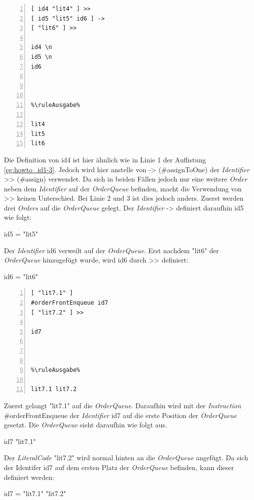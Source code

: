{
\begin{multicols}{2}
\begin{lstlisting}[language=QHS, caption=Beispiel zu {\selectListingFont \#assignToOne}, numbers=left, stepnumber=1]
%\ruleEingabe%
[ id4 "lit4" ] >>
[ id5 "lit5" id6 ] ->
[ "lit6" ] >>

id4 \n
id5 \n
id6



%\ruleAusgabe%

lit4
lit5
lit6
\end{lstlisting}
\columnbreak
Die Definition von {\selectListingFont id4} ist hier ähnlich wie in Linie 1 der Auflistung \ref{eg:howto_id1-3}.
Jedoch wird hier anstelle von {\selectListingFont ->} ({\selectListingFont \#assignToOne}) der \textit{Identifier} {\selectListingFont >>} ({\selectListingFont \#assign}) verwendet.
Da sich in beiden Fällen jedoch nur eine weitere \textit{Order} neben dem \textit{Identifier} auf der \textit{OrderQueue} befinden, macht die Verwendung von {\selectListingFont >>} keinen Unterschied.
Bei Linie 2 und 3 ist dies jedoch anders. Zuerst werden drei \textit{Orders} auf die \textit{OrderQueue} gelegt. Der \textit{Identifier} {\selectListingFont ->} definiert daraufhin {\selectListingFont id5} wie folgt: \break
\centerline{\selectListingFont id5 = "lit5"{}}
Der \textit{Identifier} {\selectListingFont id6} verweilt auf der \textit{OrderQueue}.
Erst nachdem {\selectListingFont "lit6"{}} der \textit{OrderQueue} hinzugefügt wurde, wird {\selectListingFont id6} durch {\selectListingFont >>} definiert: \break
\centerline{\selectListingFont id6 = "lit6"{}}
\end{multicols}
}

{
\begin{multicols}{2}
\begin{lstlisting}[language=QHS, caption=Beispiel zu {\selectListingFont \#orderFrontEnqueue}, numbers=left, stepnumber=1]
%\ruleEingabe%
[ "lit7.1" ]
#orderFrontEnqueue id7
[ "lit7.2" ] >>

id7



%\ruleAusgabe%

lit7.1 lit7.2
\end{lstlisting}
\columnbreak
Zuerst gelangt {\selectListingFont "lit7.1"{}} auf die \textit{OrderQueue}.
Daraufhin wird mit der \textit{Instruction} {\selectListingFont \#orderFrontEnqueue} der \textit{Identifier} {\selectListingFont id7} auf die erste Position der \textit{OrderQueue} gesetzt.
Die \textit{OrderQueue} sieht daraufhin wie folgt aus.
\centerline{\selectListingFont id7 "lit7.1"{}}
Der \textit{LiteralCode} {\selectListingFont "lit7.2"{}} wird normal hinten an die \textit{OrderQueue} angefügt.
Da sich der Identifer {\selectListingFont id7} auf dem ersten Platz der \textit{OrderQueue} befinden, kann dieser definiert werden: \break
\centerline{\selectListingFont id7 = "lit7.1"{} "lit7.2"{}}
\end{multicols}
}

